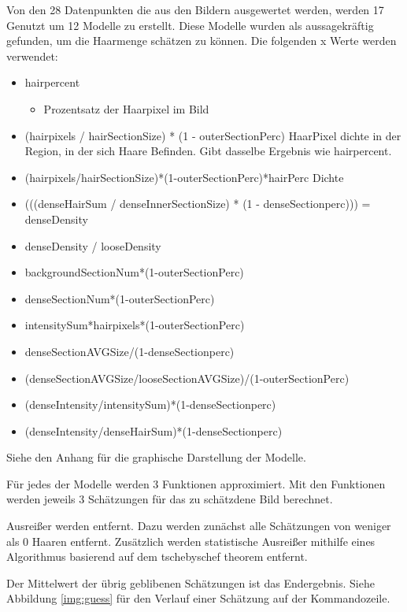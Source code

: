 \documentclass[german,a4paper,12pt,smallheadings,headsepline, titlepage, liststotoc, idextotoc,bibtoctoc,blibliography = totocnumbered]{scrartcl}
\begin{document}
Von den 28 Datenpunkten die aus den Bildern ausgewertet werden, werden 17 Genutzt um 12 Modelle zu erstellt. Diese Modelle wurden als aussagekräftig gefunden, um die Haarmenge schätzen zu können. Die folgenden x Werte werden verwendet:

\begin{itemize}
	\item hairpercent 
	\begin{itemize}
		\item Prozentsatz der Haarpixel im Bild
	\end{itemize}
	\item (hairpixels / hairSectionSize) * (1 - outerSectionPerc)
	HaarPixel dichte in der Region, in der sich Haare Befinden. Gibt dasselbe Ergebnis wie hairpercent.
	\item (hairpixels/hairSectionSize)*(1-outerSectionPerc)*hairPerc
	Dichte 
	
	\item (((denseHairSum / denseInnerSectionSize) * (1 - denseSectionperc))) = denseDensity
	\item denseDensity / looseDensity
	\item backgroundSectionNum*(1-outerSectionPerc)
	\item denseSectionNum*(1-outerSectionPerc)
	\item intensitySum*hairpixels*(1-outerSectionPerc)
	\item denseSectionAVGSize/(1-denseSectionperc)
	\item (denseSectionAVGSize/looseSectionAVGSize)/(1-outerSectionPerc)
	\item (denseIntensity/intensitySum)*(1-denseSectionperc)
	\item (denseIntensity/denseHairSum)*(1-denseSectionperc)
\end{itemize}

Siehe den Anhang für die graphische Darstellung der Modelle.

Für jedes der Modelle werden 3 Funktionen approximiert. Mit den Funktionen werden jeweils 3 Schätzungen für das zu schätzdene Bild berechnet. 

Ausreißer werden entfernt. Dazu werden zunächst alle Schätzungen von weniger als 0 Haaren entfernt. Zusätzlich werden statistische Ausreißer mithilfe eines Algorithmus basierend auf dem tschebyschef theorem entfernt. 

Der Mittelwert der übrig geblibenen Schätzungen ist das Endergebnis. 
Siehe Abbildung \ref{img:guess} für den Verlauf einer Schätzung auf der Kommandozeile.
\end{document}
